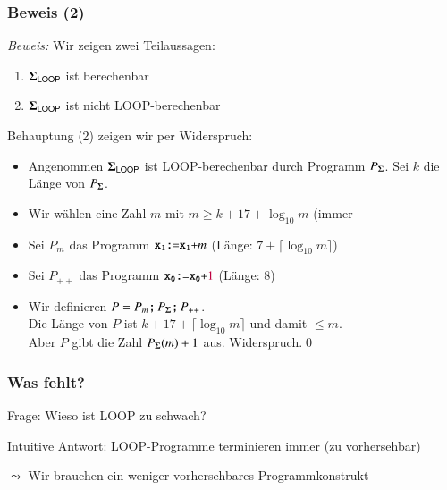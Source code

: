 \documentclass[aspectratio=1610,onlymath]{beamer}
\begin{document}
\begin{frame}[t]\frametitle{Beweis (2)}


\emph{Beweis:} Wir zeigen zwei Teilaussagen:

\begin{enumerate}[(1)]
\item $\boldsymbol{\Sigma}_{\textsf{LOOP}}$ ist berechenbar
\item $\boldsymbol{\Sigma}_{\textsf{LOOP}}$ ist nicht LOOP-berechenbar
\end{enumerate}\pause

Behauptung (2) zeigen wir per Widerspruch:\pause
\begin{itemize}
\item Angenommen $\boldsymbol{\Sigma}_{\textsf{LOOP}}$ ist LOOP-berechenbar durch Programm $P_{\boldsymbol{\Sigma}}$. Sei $k$ die Länge von $P_{\boldsymbol{\Sigma}}$.\pause
\item Wir wählen eine Zahl $m$ mit $m\geq k+17+\log_{10} m$ (immer \pause
\item Sei $P_m$ das Programm $\texttt{x}_{\texttt{1}}\texttt{:=}\texttt{x}_{\texttt{1}}\texttt{+}m$ (Länge: $7+\lceil\log_{10}m\rceil$)\pause
\item Sei $P_{++}$ das Programm $\texttt{x}_{\texttt{0}}\texttt{:=}\texttt{x}_{\texttt{0}}\texttt{+}\textcolor{purple}{1}$ (Länge: $8$)\pause
\item Wir definieren $P = P_m\texttt{;}\, P_{\boldsymbol{\Sigma}}\texttt{;}\, P_{++}$.\\\pause
Die Länge von $P$ ist $k+17+\lceil\log_{10}m\rceil$ und damit $\leq m$.\\\pause
Aber $P$ gibt die Zahl $P_{\boldsymbol{\Sigma}}(m)+1$ aus. 
Widerspruch.\qed
\end{itemize}

\end{frame}


\begin{frame}\frametitle{Was fehlt?}

\alert{Frage:} Wieso ist LOOP zu schwach?\medskip\pause

\alert{Intuitive Antwort:} LOOP-Programme terminieren immer (zu vorhersehbar)
\bigskip

$\leadsto$ Wir brauchen ein weniger vorhersehbares Programmkonstrukt

\end{frame}
\end{document}
